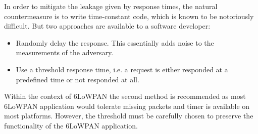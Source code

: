 In order to mitigate the leakage given by response times, the natural countermeasure is to write time-constant code, which is known to be notoriously difficult. But two approaches are available to a software developer:
\begin{itemize}
	\item Randomly delay the response. This essentially adds noise to the measurements of the adversary.
	
	\item Use a threshold response time, i.e. a request is either responded at a predefined time or not responded at all. 
\end{itemize}
Within the context of 6LoWPAN the second method is recommended as most 6LoWPAN application would tolerate missing packets and timer is available on most platforms. However, the threshold must be carefully chosen to preserve the functionality of the 6LoWPAN application.

